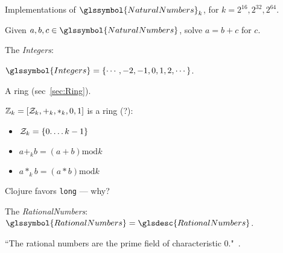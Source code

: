 Implementations of $\glssymbol{NaturalNumbers}_{k}$,
for $k = 2^{16}, 2^{32}, 2^{64}$.

\label{sec:Integers}

Given $a,b,c \in \glssymbol{NaturalNumbers}$,
solve $a = b + c$ for $c$.

The \textit{\gls{Integers}}: 

$\glssymbol{Integers} = \{\cdots, -2, -1, 0, 1, 2, \cdots\}$.

A ring (sec~\ref{sec:Ring}).

\label{sec:Cyclic-integers}

$\mathbb{Z}_{k} = \left[ \mathcal{Z}_{k}, +_k, *_k, 0, 1 \right]$
is a ring (?):
\begin{itemize}
  \item $\mathcal{Z}_{k} = \left\{ 0. \ldots k-1  \right\}$
  \item $ a +_k b = \left( a + b \right) \text{mod} k$
  \item $ a *_k b = \left( a * b \right) \text{mod} k$
\end{itemize}

\label{sec:int}

Clojure favors \texttt{long} --- why?

\label{sec:BigInteger}

\label{sec:Rational-numbers}

The \textit{\gls{RationalNumbers}}: 
$\glssymbol{RationalNumbers} = \glsdesc{RationalNumbers}$.

\label{sec:Axiomatic_definition_of_Q}

``The rational numbers are the prime field of characteristic 
0."~\cite{quora:RationalAxioms}.

